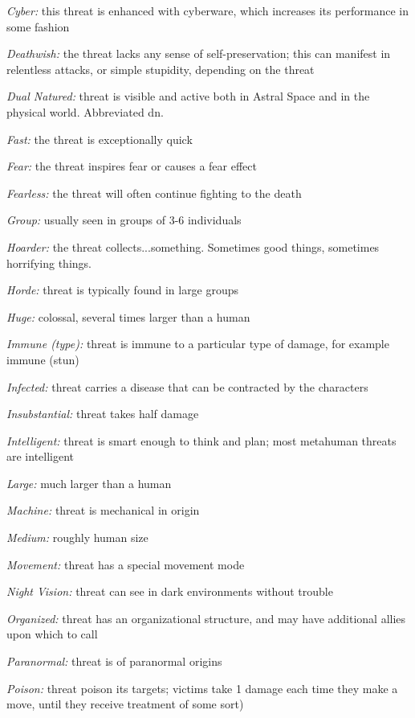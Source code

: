 \documentclass[oneside,10pt]{article}
\begin{document}
\begin{multicols}{2}
\textit{Cyber:} this threat is enhanced with cyberware, which increases its performance in some fashion

\textit{Deathwish:} the threat lacks any sense of self-preservation;
this can manifest in relentless attacks, or simple stupidity,
depending on the threat

\textit{Dual Natured:} threat is visible and active both in Astral
Space and in the physical world. Abbreviated dn.

\textit{Fast:} the threat is exceptionally quick

\textit{Fear:} the threat inspires fear or causes
a fear effect

\textit{Fearless:} the threat will often continue
fighting to the death

\textit{Group:} usually seen in groups of 3-6
individuals

\textit{Hoarder:} the threat collects...something. Sometimes good
things, sometimes horrifying things.

\textit{Horde:} threat is typically found in large
groups

\textit{Huge:} colossal, several times larger than
a human

\textit{Immune (type):} threat is immune to a particular type of
damage, for example immune (stun)

\textit{Infected:} threat carries a disease that can be contracted by
the characters

\textit{Insubstantial:} threat takes half damage

\textit{Intelligent:} threat is smart enough to think and plan; most
metahuman threats are intelligent

\textit{Large:} much larger than a human

\textit{Machine:} threat is mechanical in origin

\textit{Medium:} roughly human size

\textit{Movement:} threat has a special movement
mode

\textit{Night Vision:} threat can see in dark environments without
trouble

\textit{Organized:} threat has an organizational structure, and may
have additional allies upon which to call

\textit{Paranormal:} threat is of paranormal origins

\textit{Poison:} threat poison its targets; victims take 1 damage
each time they make a move, until they receive treatment
of some sort)


\end{multicols}
\end{document}
